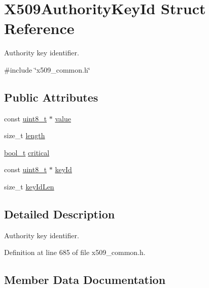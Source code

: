 \hypertarget{structX509AuthorityKeyId}{}\section{X509\+Authority\+Key\+Id Struct Reference}
\label{structX509AuthorityKeyId}


Authority key identifier.  




{\ttfamily \#include \char`\"{}x509\+\_\+common.\+h\char`\"{}}

\subsection*{Public Attributes}
\begin{DoxyCompactItemize}
\item 
const \hyperlink{stdint_8h_aba7bc1797add20fe3efdf37ced1182c5}{uint8\+\_\+t} $\ast$ \hyperlink{structX509AuthorityKeyId_a8d58117612a6a39683f7dac0454d41bb}{value}
\item 
size\+\_\+t \hyperlink{structX509AuthorityKeyId_ad786e919eade63c0dd214834c7c0728b}{length}
\item 
\hyperlink{compiler__port_8h_a812d16e5494522586b3784e55d479912}{bool\+\_\+t} \hyperlink{structX509AuthorityKeyId_a6fcba640adab232183f55a463d066b81}{critical}
\item 
const \hyperlink{stdint_8h_aba7bc1797add20fe3efdf37ced1182c5}{uint8\+\_\+t} $\ast$ \hyperlink{structX509AuthorityKeyId_ab96ff029d18bc7035b698c9b0daa9681}{key\+Id}
\item 
size\+\_\+t \hyperlink{structX509AuthorityKeyId_ae1cbf5840bbe41649ea904a2f787278d}{key\+Id\+Len}
\end{DoxyCompactItemize}


\subsection{Detailed Description}
Authority key identifier. 

Definition at line 685 of file x509\+\_\+common.\+h.



\subsection{Member Data Documentation}
\mbox{\label{structX509AuthorityKeyId_a6fcba640adab232183f55a463d066b81}} 

